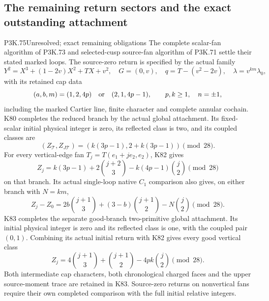 \subsection{The remaining return sectors and the exact outstanding attachment}
\begin{statement}{P3K.75}{Unresolved; exact remaining obligations}
The complete scalar-fan algorithm of P3K.73 and selected-cusp
source-fan algorithm of P3K.71 settle their stated marked loops.
The source-zero return is specified by the actual family
\[
 Y^2=X^3+(1-2v)X^2+TX+v^2,\quad G=(0,v),\quad
 q=T-(v^2-2v),\quad \lambda=v^{km}\lambda_0,
\]
with its retained cap data
\[
 (a,b,m)=(1,2,4p)\quad\hbox{or}\quad(2,1,4p-1),
 \qquad p,k\ge1,\quad n=\pm1,
\]
including the marked Cartier line, finite character and complete
annular cochain. K80 completes the reduced branch by the actual
global attachment. Its fixed-scalar initial physical integer is
zero, its reflected class is two, and its coupled classes are
\[
 (Z_{\mathcal T},Z_{J\mathcal T})
       =(k(3p-1),2+k(3p-1))\pmod {28}.
\]
For every vertical-edge fan \(T_j=T(e_1+je_2,e_2)\), K82 gives
\[
 Z_j=k(3p-1)+2\binom{j+2}{3}
                    -k(4p-1)\binom j2\pmod {28}
\]
on that branch. Its actual single-loop native \(C_1\) comparison
also gives, on either branch with \(N=km\),
\[
 Z_j-Z_0=2b\binom{j+1}{3}+(3-b)\binom{j+1}{2}
                                     -N\binom j2\pmod {28}.
\]
K83 completes the separate good-branch two-primitive global
attachment. Its initial physical integer is zero and its
reflected class is one, with the coupled pair \((0,1)\).
Combining its actual initial return with K82 gives every good
vertical class
\[
 Z_j=4\binom{j+1}{3}+\binom{j+1}{2}
                       -4pk\binom j2\pmod {28}.
\]
Both intermediate cap characters, both chronological charged
faces and the upper source-moment trace are retained in K83.
Source-zero returns on nonvertical fans require their own
completed comparison with the full initial relative integers.


\end{statement}
